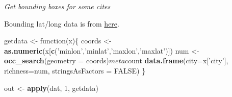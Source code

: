 \documentclass[author-year, review, 11pt]{components/elsarticle} %
\newenvironment{Shaded}{\begin{snugshade}}{\end{snugshade}}
\newcommand{\KeywordTok}[1]{\textcolor[rgb]{0.13,0.29,0.53}{\textbf{{#1}}}}
\newcommand{\DataTypeTok}[1]{\textcolor[rgb]{0.13,0.29,0.53}{{#1}}}
\newcommand{\DecValTok}[1]{\textcolor[rgb]{0.00,0.00,0.81}{{#1}}}
\newcommand{\CharTok}[1]{\textcolor[rgb]{0.31,0.60,0.02}{{#1}}}
\newcommand{\StringTok}[1]{\textcolor[rgb]{0.31,0.60,0.02}{{#1}}}
\newcommand{\OtherTok}[1]{\textcolor[rgb]{0.56,0.35,0.01}{{#1}}}
\newcommand{\NormalTok}[1]{{#1}}
\begin{document}
\emph{Get bounding boxes for some cites}

Bounding lat/long data is from
\href{https://raw.github.com/amyxzhang/boundingbox-cities/master/boundbox.txt}{here}.

\begin{Shaded}
\end{Shaded}

\begin{Shaded}
\begin{Highlighting}[]
\NormalTok{getdata <-}\StringTok{ }\NormalTok{function(x)\{}
  \NormalTok{coords <-}\StringTok{ }\KeywordTok{as.numeric}\NormalTok{(x[}\KeywordTok{c}\NormalTok{(}\StringTok{'minlon'}\NormalTok{,}\StringTok{'minlat'}\NormalTok{,}\StringTok{'maxlon'}\NormalTok{,}\StringTok{'maxlat'}\NormalTok{)])}
  \NormalTok{num <-}\StringTok{ }\KeywordTok{occ_search}\NormalTok{(}\DataTypeTok{geometry =} \NormalTok{coords)$meta$count}
  \KeywordTok{data.frame}\NormalTok{(}\DataTypeTok{city=}\NormalTok{x[}\StringTok{'city'}\NormalTok{], }\DataTypeTok{richness=}\NormalTok{num, }\DataTypeTok{stringsAsFactors =} \OtherTok{FALSE}\NormalTok{)}
\NormalTok{\}}
\end{Highlighting}
\end{Shaded}

\begin{Shaded}
\begin{Highlighting}[]
\NormalTok{out <-}\StringTok{ }\KeywordTok{apply}\NormalTok{(dat, }\DecValTok{1}\NormalTok{, getdata)}
\end{Highlighting}
\end{Shaded}
\end{document}
